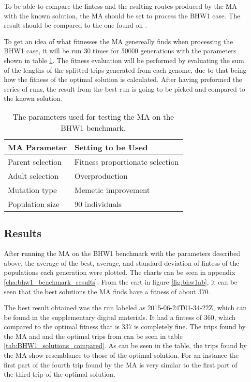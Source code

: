 To be able to compare the fintess and the rsulting routes produced by the MA with the known solution, the MA should be set to process the BHW1 case. The result should be compared to the one found on \citet{BHW1Solution}.

To get an idea of what fitnesses the MA genereally finds when processing the BHW1 case, it will be run 30 times for 50000 generations with the parameters shown in table \ref{tab:BHW1_params_table}. The fitness evaluation will be performed by evaluating the sum of the lengths of the splitted trips generated from each genome, due to that being how the fitness of the optimal solution is calculated. After having preformed the series of runs, the result from the best run is going to be picked and compared to the known solution.

{
\begin{table}[tbph]
\centering
\begin{tabular}{ll}
\hline
\textbf{MA Parameter} & \textbf{Setting to be Used}     \\ \hline
Parent selection      & Fitness proportionate selection \\
Adult selection       & Overproduction                  \\
Mutation type         & Memetic improvement             \\
Population size       & 90 individuals                  \\ \hline
\end{tabular}
\caption{The parameters used for testing the MA on the BHW1 benchmark.}
\label{tab:BHW1_params_table}
\end{table}
}

\subsection{Results}

After running the MA on the BHW1 benchmark with the parameters described above, the average of the best, average, and standard deviation of fintess of the populations each generation were plotted. The charts can be seen in appendix \ref{cha:bhw1_benchmark_results}. From the cart in figure \ref{fig:bhw1ab}, it can be seen that the best solutions the MA finds have a fitness of about 370.

The best result obtained was the run labeled as 2015-06-24T01-34-22Z, which can be found in the supplementary digital materials. It had a fintess of 360, which compared to the optimal fitness that is 337 is completely fine. The trips found by the MA and and the optimal trips from \citet{BHW1Solution} can be seen in table \ref{tab:BHW1_solutions_compared}. As can be seen in the table, the trips found by the MA show resemblance to those of the optimal solution. For an instance the first part of the fourth trip found by the MA is very similar to the first part of the third trip of the optimal solution.

